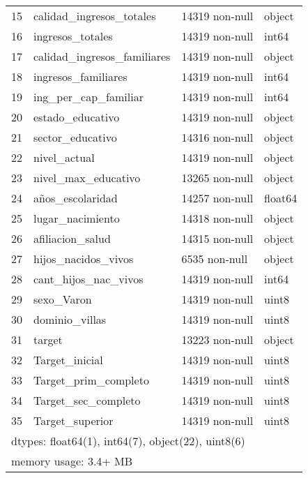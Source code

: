 \documentclass[a4paper]{article}
\begin{document}
\begin{table}[H]
\begin{center}
\begin{tabular}{clll}
        15 & calidad\_ingresos\_totales    & 14319 non-null & object  \\
        16 & ingresos\_totales            & 14319 non-null & int64   \\
        17 & calidad\_ingresos\_familiares & 14319 non-null & object  \\
        18 & ingresos\_familiares         & 14319 non-null & int64   \\
        19 & ing\_per\_cap\_familiar        & 14319 non-null & int64   \\
        20 & estado\_educativo            & 14319 non-null & object  \\
        21 & sector\_educativo            & 14316 non-null & object  \\
        22 & nivel\_actual                & 14319 non-null & object  \\
        23 & nivel\_max\_educativo         & 13265 non-null & object  \\
        24 & años\_escolaridad            & 14257 non-null & float64 \\
        25 & lugar\_nacimiento            & 14318 non-null & object  \\
        26 & afiliacion\_salud            & 14315 non-null & object  \\
        27 & hijos\_nacidos\_vivos         & 6535 non-null  & object  \\
        28 & cant\_hijos\_nac\_vivos        & 14319 non-null & int64   \\
        29 & sexo\_Varon                  & 14319 non-null & uint8   \\
        30 & dominio\_villas              & 14319 non-null & uint8   \\
        31 & target                      & 13223 non-null & object  \\
        32 & Target\_inicial              & 14319 non-null & uint8   \\
        33 & Target\_prim\_completo        & 14319 non-null & uint8   \\
        34 & Target\_sec\_completo         & 14319 non-null & uint8   \\
        35 & Target\_superior             & 14319 non-null & uint8   \\
        \multicolumn{4}{l}{dtypes: float64(1), int64(7), object(22), uint8(6)}  \\
        \multicolumn{4}{l}{memory usage: 3.4+ MB}
    \end{tabular}\end{center}
    \end{table}
\end{document}
